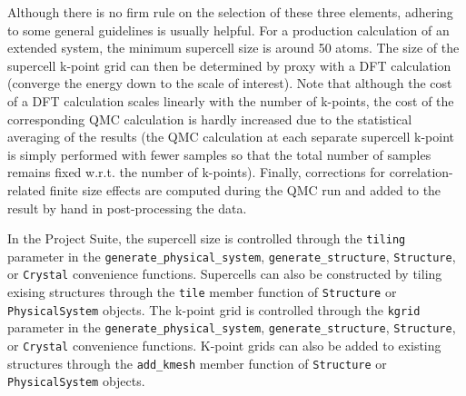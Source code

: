 \documentclass[oneside,11pt]{memoir}
\numberwithin{equation}{section}
\begin{document}
Although there is no firm rule on the selection of these three elements, 
adhering to some general guidelines is usually helpful.  For a production 
calculation of an extended system, the minimum supercell size is around 50 
atoms.  The size of the supercell k-point grid can then be determined by 
proxy with a DFT calculation (converge the energy down to the scale of 
interest).  Note that although the cost of a DFT calculation scales linearly 
with the number of k-points, the cost of the corresponding QMC calculation 
is hardly increased due to the statistical averaging of the results 
(the QMC calculation at each separate supercell k-point is simply performed 
with fewer samples so that the total number of samples remains fixed w.r.t. 
the number of k-points).  Finally, corrections for correlation-related 
finite size effects are computed during the QMC run and added to the result 
by hand in post-processing the data.

In the Project Suite, the supercell size is controlled through the 
\texttt{tiling} parameter in the \texttt{generate\_physical\_system}, 
\texttt{generate\_structure}, \texttt{Structure}, or \texttt{Crystal} 
convenience functions.  Supercells can also be constructed by tiling exising 
structures through the \texttt{tile} member function of \texttt{Structure} or 
\texttt{PhysicalSystem} objects.  The k-point grid is controlled through the 
\texttt{kgrid} parameter in the 
\texttt{generate\_physical\_system}, 
\texttt{generate\_structure}, \texttt{Structure}, or \texttt{Crystal} 
convenience functions.  K-point grids can also be added to existing structures 
through the \texttt{add\_kmesh} member function of \texttt{Structure} or 
\texttt{PhysicalSystem} objects.
\end{document}
